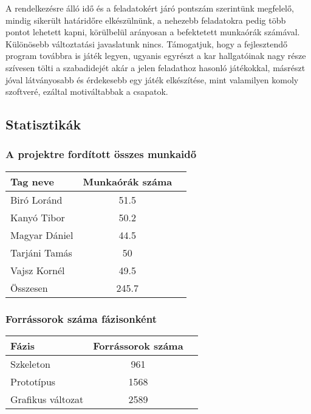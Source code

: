A rendelkezésre álló idő és a feladatokért járó pontszám szerintünk megfelelő, mindig sikerült határidőre elkészülnünk, a nehezebb feladatokra pedig több pontot lehetett kapni, körülbelül arányosan a befektetett munkaórák számával. Különösebb változtatási javaslatunk nincs. Támogatjuk, hogy a fejlesztendő program továbbra is játék legyen, ugyanis egyrészt a kar hallgatóinak nagy része szívesen tölti a szabadidejét akár a jelen feladathoz hasonló játékokkal, másrészt jóval látványosabb és érdekesebb egy játék elkészítése, mint valamilyen komoly szoftveré, ezáltal motiváltabbak a csapatok.


\subsection{Statisztikák}

\subsubsection{A projektre fordított összes munkaidő}

\begin{tabular}{|p{130pt}|c|p{150pt}|}
\hline 
\textbf{Tag neve} & \textbf{Munkaórák száma}\\ 
\hline 
Biró Loránd & 51.5\\ 
\hline 
Kanyó Tibor & 50.2\\
\hline 
Magyar Dániel & 44.5\\
\hline 
Tarjáni Tamás & 50\\
\hline 
Vajsz Kornél & 49.5\\
\hline 
Összesen & 245.7\\
\hline
\end{tabular}

\newpage

\subsubsection{Forrássorok száma fázisonként}

\begin{tabular}{|p{130pt}|c|p{150pt}|}
\hline 
\textbf{Fázis} & \textbf{Forrássorok száma}\\ 
\hline 
Szkeleton & 961\\ 
\hline 
Prototípus & 1568\\
\hline 
Grafikus változat & 2589
\hline
\end{tabular}


